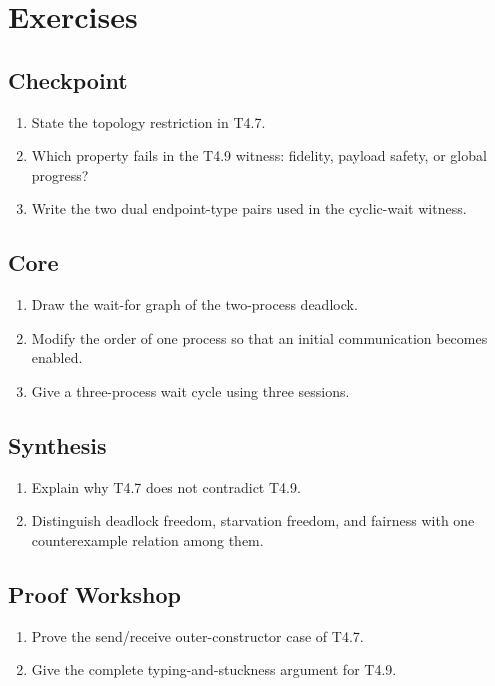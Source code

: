 \section{Exercises}
\subsection*{Checkpoint}
\begin{enumerate}[label=\textbf{6.\arabic*},start=1]
\item State the topology restriction in T4.7.
\item Which property fails in the T4.9 witness: fidelity, payload safety, or global progress?
\item Write the two dual endpoint-type pairs used in the cyclic-wait witness.
\end{enumerate}
\subsection*{Core}
\begin{enumerate}[label=\textbf{6.\arabic*},start=4]
\item Draw the wait-for graph of the two-process deadlock.
\item Modify the order of one process so that an initial communication becomes enabled.
\item Give a three-process wait cycle using three sessions.
\end{enumerate}
\subsection*{Synthesis}
\begin{enumerate}[label=\textbf{6.\arabic*},start=7]
\item Explain why T4.7 does not contradict T4.9.
\item Distinguish deadlock freedom, starvation freedom, and fairness with one counterexample relation among them.
\end{enumerate}
\subsection*{Proof Workshop}
\begin{enumerate}[label=\textbf{6.\arabic*},start=9]
\item Prove the send/receive outer-constructor case of T4.7.
\item Give the complete typing-and-stuckness argument for T4.9.
\end{enumerate}
